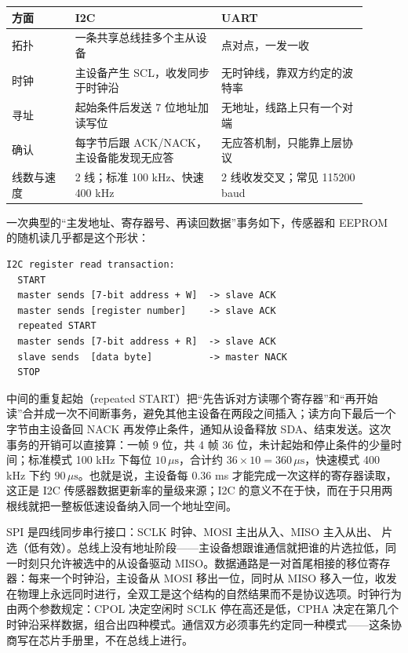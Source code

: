 \begin{longtable}{L{0.16\linewidth}L{0.37\linewidth}L{0.37\linewidth}}
\toprule
方面 & I2C & UART \\
\midrule
拓扑 & 一条共享总线挂多个主从设备 & 点对点，一发一收 \\
时钟 & 主设备产生 SCL，收发同步于时钟沿 & 无时钟线，靠双方约定的波特率 \\
寻址 & 起始条件后发送 7 位地址加读写位 & 无地址，线路上只有一个对端 \\
确认 & 每字节后跟 ACK/NACK，主设备能发现无应答 & 无应答机制，只能靠上层协议 \\
线数与速度 & 2 线；标准 100 kHz、快速 400 kHz & 2 线收发交叉；常见 115200 baud \\
\bottomrule
\end{longtable}

一次典型的“主发地址、寄存器号、再读回数据”事务如下，传感器和 EEPROM 的随机读几乎都是这个形状：

\begin{lstlisting}
I2C register read transaction:
  START
  master sends [7-bit address + W]  -> slave ACK
  master sends [register number]    -> slave ACK
  repeated START
  master sends [7-bit address + R]  -> slave ACK
  slave sends  [data byte]          -> master NACK
  STOP
\end{lstlisting}

中间的重复起始（repeated START）把“先告诉对方读哪个寄存器”和“再开始读”合并成一次不间断事务，避免其他主设备在两段之间插入；读方向下最后一个字节由主设备回 NACK 再发停止条件，通知从设备释放 SDA、结束发送。这次事务的开销可以直接算：一帧 9 位，共 4 帧 36 位，未计起始和停止条件的少量时间；标准模式 100 kHz 下每位 $10\,\mu\text{s}$，合计约 $36\times10=360\,\mu\text{s}$，快速模式 400 kHz 下约 $90\,\mu\text{s}$。也就是说，主设备每 0.36 ms 才能完成一次这样的寄存器读取，这正是 I2C 传感器数据更新率的量级来源；I2C 的意义不在于快，而在于只用两根线就把一整板低速设备纳入同一个地址空间。

SPI 是四线同步串行接口：SCLK 时钟、MOSI 主出从入、MISO 主入从出、 片选（低有效）。总线上没有地址阶段——主设备想跟谁通信就把谁的片选拉低，同一时刻只允许被选中的从设备驱动 MISO。数据通路是一对首尾相接的移位寄存器：每来一个时钟沿，主设备从 MOSI 移出一位，同时从 MISO 移入一位，收发在物理上永远同时进行，全双工是这个结构的自然结果而不是协议选项。时钟行为由两个参数规定：CPOL 决定空闲时 SCLK 停在高还是低，CPHA 决定在第几个时钟沿采样数据，组合出四种模式。通信双方必须事先约定同一种模式——这条协商写在芯片手册里，不在总线上进行。

